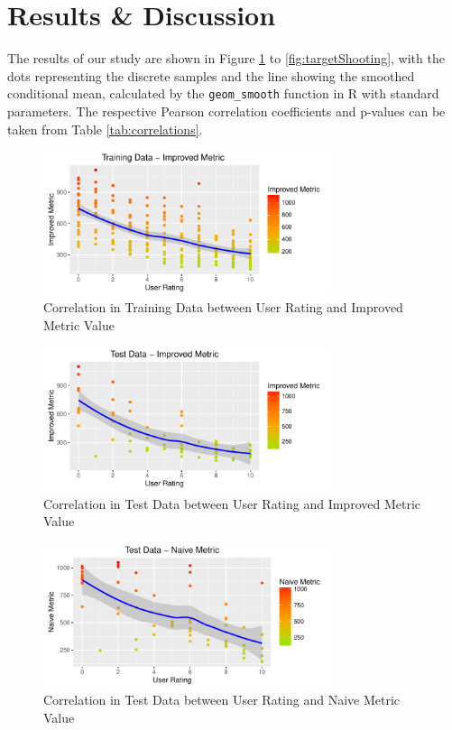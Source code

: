 \documentclass{sig-alternate-05-2015}
\begin{document}
\section{Results \& Discussion}

The results of our study are shown in Figure \ref{fig:trainingData} to \ref{fig:targetShooting}, with the dots representing the discrete samples and the line showing the smoothed conditional mean, calculated by the \texttt{geom\_smooth} function in R with standard parameters. The respective Pearson correlation coefficients and p-values can be taken from Table \ref{tab:correlations}.

\begin{figure}
\centering
\includegraphics[width=8.45cm]{TrainingDataImproved}
\vspace{-20pt}
\caption{Correlation in Training Data between User Rating and Improved Metric Value}
\label{fig:trainingData}
\vspace{-10pt}
\end{figure}

\begin{figure}
\centering
\includegraphics[width=8.45cm]{TestDataImproved}
\vspace{-20pt}
\caption{Correlation in Test Data between User Rating and Improved Metric Value}
\vspace{-10pt}
\label{fig:testData}
\end{figure}

\begin{figure}
\centering
\includegraphics[width=8.45cm]{TestDataNaive}
\vspace{-20pt}
\caption{Correlation in Test Data between User Rating and Naive Metric Value}
\label{fig:testDataNaive}
\vspace{-10pt}
\end{figure}
\end{document}
